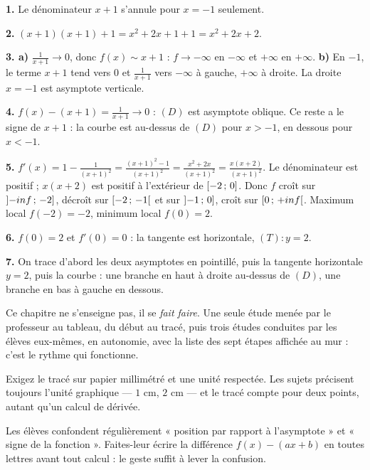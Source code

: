\begin{corrige}
\textbf{1.} Le dénominateur $x+1$ s'annule pour $x = -1$ seulement.

\textbf{2.} $(x+1)(x+1)+1 = x^{2}+2x+1+1 = x^{2}+2x+2$. \checkmark

\textbf{3. a)} $\frac{1}{x+1} \to 0$, donc $f(x) \sim x+1$ :
$f \to -\infty$ en $-\infty$ et $+\infty$ en $+\infty$.
\textbf{b)} En $-1$, le terme $x+1$ tend vers $0$ et $\frac{1}{x+1}$ vers
$-\infty$ à gauche, $+\infty$ à droite. La droite $x = -1$ est asymptote
verticale.

\textbf{4.} $f(x)-(x+1) = \frac{1}{x+1} \to 0$ : $(D)$ est asymptote
oblique. Ce reste a le signe de $x+1$ : la courbe est au-dessus de $(D)$
pour $x>-1$, en dessous pour $x<-1$.

\textbf{5.} $f'(x) = 1-\frac{1}{(x+1)^{2}} = \frac{(x+1)^{2}-1}{(x+1)^{2}}
= \frac{x^{2}+2x}{(x+1)^{2}} = \frac{x(x+2)}{(x+1)^{2}}$. Le dénominateur
est positif ; $x(x+2)$ est positif à l'extérieur de $\left[-2\,;\,0\right]$.
Donc $f$ croît sur $\left]-inf\,;\,-2\right]$, décroît sur
$\left[-2\,;\,-1\right[$ et sur $\left]-1\,;\,0\right]$, croît sur
$\left[0\,;\,+inf\right[$. Maximum local $f(-2) = -2$, minimum local
$f(0) = 2$.

\textbf{6.} $f(0) = 2$ et $f'(0) = 0$ : la tangente est horizontale,
$(T) : y = 2$.

\textbf{7.} On trace d'abord les deux asymptotes en pointillé, puis la
tangente horizontale $y = 2$, puis la courbe : une branche en haut à droite
au-dessus de $(D)$, une branche en bas à gauche en dessous.
\end{corrige}

\begin{notepourlaclasse}
Ce chapitre ne s'enseigne pas, il se \emph{fait faire}. Une seule étude
menée par le professeur au tableau, du début au tracé, puis trois études
conduites par les élèves eux-mêmes, en autonomie, avec la liste des sept
étapes affichée au mur : c'est le rythme qui fonctionne.

Exigez le tracé sur papier millimétré et une unité respectée. Les sujets
précisent toujours l'unité graphique — $1$ cm, $2$ cm — et le tracé compte
pour deux points, autant qu'un calcul de dérivée.

Les élèves confondent régulièrement « position par rapport à l'asymptote »
et « signe de la fonction ». Faites-leur écrire la différence $f(x)-(ax+b)$
en toutes lettres avant tout calcul : le geste suffit à lever la confusion.
\end{notepourlaclasse}
